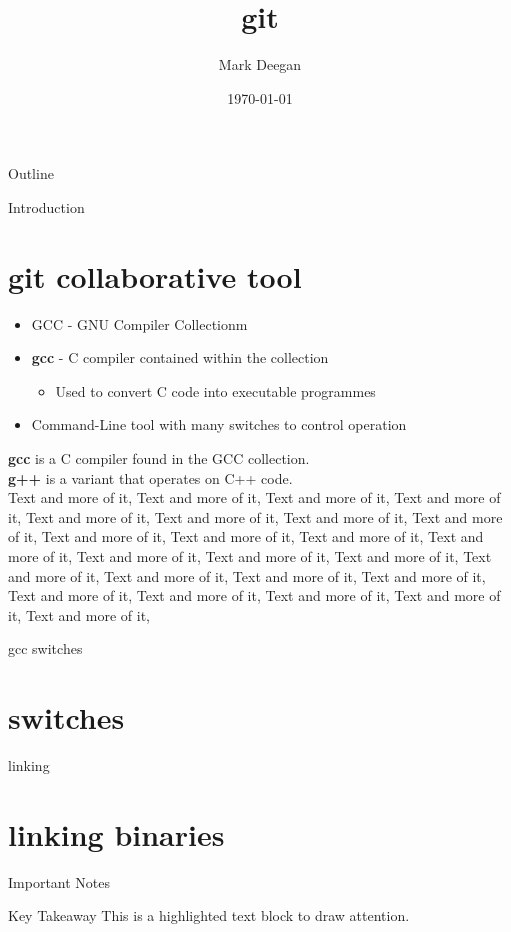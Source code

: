 \documentclass{beamer}
\title{\textbf{git}}
\author{Mark Deegan}
\institute{TU Dublin}
\date{\today}
\begin{document}
\begin{frame}
    \maketitle
\end{frame}

\begin{frame}{Outline}
    \tableofcontents
\end{frame}

\begin{frame}[allowframebreaks]{Introduction}
    \section{git collaborative tool}
    \begin{itemize}
        \item GCC - GNU Compiler Collectionm
        \item \textbf{gcc} - C compiler contained within the collection
        \begin{itemize}
            \item Used to convert C code into executable programmes
        \end{itemize}
        \item Command-Line tool with many switches to control operation
    \end{itemize}
    \textbf{gcc} is a C compiler found in the GCC collection.
    \\
    \textbf{g++} is a variant that operates on C++ code.
    \\
    \framebreak
    Text and more of it, Text and more of it, Text and more of it, Text and more of it, Text and more of it, Text and more of it, Text and more of it, Text and more of it, Text and more of it, Text and more of it, Text and more of it, Text and more of it, Text and more of it, \framebreak
    Text and more of it, Text and more of it, Text and more of it, Text and more of it, Text and more of it, Text and more of it, Text and more of it, Text and more of it, Text and more of it, Text and more of it, Text and more of it, 
\end{frame}

\begin{frame}[allowframebreaks]{gcc switches}
    \section{switches}
\end{frame}

\begin{frame}[allowframebreaks]{linking}
    \section{linking binaries}
\end{frame}

\begin{frame}{Important Notes}
    \begin{block}{Key Takeaway}
        This is a highlighted text block to draw attention.
    \end{block}
\end{frame}
\end{document}
